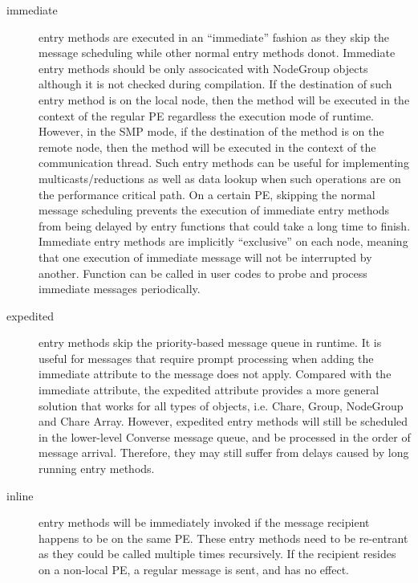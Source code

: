\begin{description}
\item[immediate] entry methods are executed in an
``immediate'' fashion as they skip the message scheduling while other normal
entry methods donot. Immediate entry methods should be only associcated with
NodeGroup objects although it is not checked during compilation. If the
destination of such entry method is on the local node, then the method will be
executed in the context of the regular PE regardless the execution mode of
\charmpp{} runtime. However, in the SMP mode, if the destination of the method
is on the remote node, then the method will be executed in the context of the
communication thread.  
Such entry methods can be useful for implementing multicasts/reductions as well
as data lookup when such operations are on the performance critical path. On a
certain \charmpp{} PE, skipping the normal message scheduling prevents the
execution of immediate entry methods from being delayed by entry functions that
could take a long time to finish. Immediate entry methods are implicitly
``exclusive'' on each node, meaning that one execution of immediate message
will not be interrupted by another. Function  can be
called in user codes to probe and process immediate messages periodically.

\item[expedited] entry methods skip the priority-based message
queue in \charmpp{} runtime. It is useful for messages that require prompt
processing when adding the immediate attribute to the message does not apply.
Compared with the immediate attribute, the expedited attribute provides a more
general solution that works for all types of \charmpp{} objects, i.e. Chare,
Group, NodeGroup and Chare Array. However, expedited entry methods will still
be scheduled in the lower-level Converse message queue, and be processed in the
order of message arrival. Therefore, they may still suffer from delays caused
by long running entry methods.

\item[inline] entry methods will be immediately invoked if the
message recipient happens to be on the same PE. These entry methods need to be
re-entrant as they could be called multiple times recursively. If the recipient
resides on a non-local PE, a regular message is sent, and  has no
effect.


\end{description}
